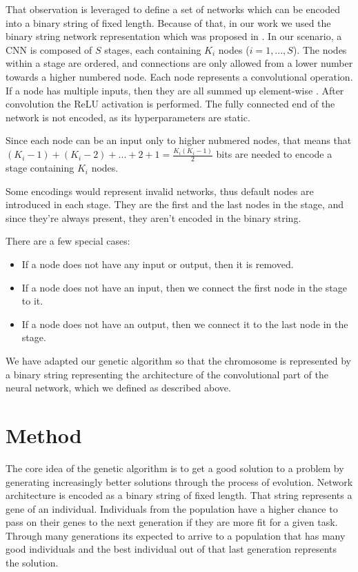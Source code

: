 \documentclass[eng]{simposium}
\begin{document}
That observation is leveraged to define a set of networks which 
can be encoded into a binary string of fixed length. 
Because of that, in our work we used the binary string network representation which was proposed in \cite{4}. 
In our scenario, a CNN is composed of $S$ stages, each containing 
$K_i$ nodes ($i=1,...,S$). 
The nodes within a stage are ordered, and connections are only allowed from a lower number towards a higher numbered node.
Each node represents a convolutional operation. If a node has multiple inputs, then they are all summed up element-wise \cite{4}.
After convolution the ReLU activation is performed. 
The fully connected end of the network is not encoded, as its hyperparameters are static. 

Since each node can be an input only to higher nubmered nodes, that means that 
$(K_i -1) + (K_i - 2) + ... + 2 + 1 = \frac{K_i(K_i-1)}{2}$ bits are needed to encode a stage containing $K_i$ nodes.

Some encodings would represent invalid networks, thus default nodes are introduced in each stage.
They are the first and the last nodes in the stage, and since they're always present, they aren't encoded in the binary string.

There are a few special cases:
\begin{itemize}
    \item If a node does not have any input or output, then it is removed.
    \item If a node does not have an input, then we connect the first node in the stage to it.
    \item If a node does not have an output, then we connect it to the last node in the stage.
\end{itemize}

We have adapted our genetic algorithm so that the chromosome is represented by a binary string representing 
the architecture of the convolutional part of the neural network, which we defined as described above. 

\section{Method}

The core idea of the genetic algorithm is to get a good solution to a problem by generating increasingly better solutions through the process of evolution.
Network architecture is encoded as a binary string of fixed length. That string represents a gene of an individual.
Individuals from the population have a higher chance to pass on their genes to the next generation if they are more fit for a given task.
Through many generations its expected to arrive to a population that has many good individuals and the best individual out of that last generation represents the solution.
\end{document}
